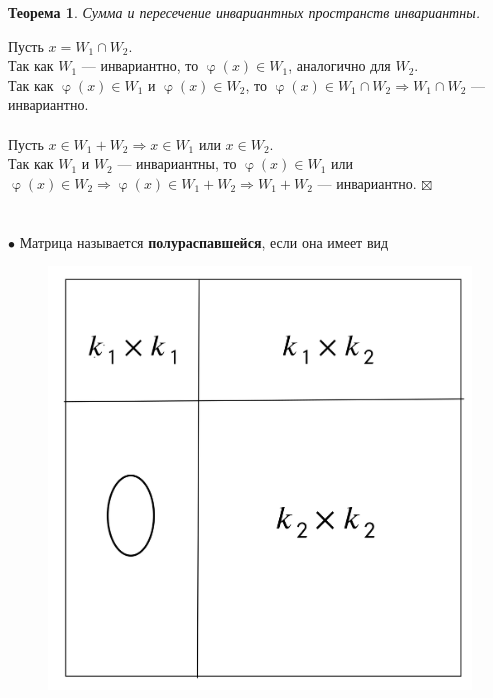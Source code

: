 \documentclass[a4paper, 12pt]{article}
\newtheorem*{theorem}{Теорема}
\newenvironment{Proof}
{\par\noindent{$\blacklozenge$}}
{\hfill$\scriptstyle\boxtimes$}
\renewcommand{\varphi}{\upvarphi}
\begin{document}
    \begin{theorem}
        Сумма и пересечение инвариантных пространств инвариантны.
    \end{theorem}
    \begin{Proof}
    Пусть $x = W_1 \cap W_2$.\\
    Так как $W_1$ --- инвариантно, то $\varphi(x) \in W_1$, аналогично для $W_2$.\\
    Так как $\varphi(x) \in W_1$ и $\varphi(x) \in W_2$, то $\varphi(x) \in W_1 \cap W_2 \Rightarrow W_1 \cap W_2$ --- инвариантно.\\\\
    Пусть $x \in W_1 + W_2 \Rightarrow x \in W_1$ или $x \in W_2$.\\
    Так как $W_1$ и $W_2$ --- инвариантны, то $\varphi(x) \in W_1$ или $\varphi(x) \in W_2 \Rightarrow \varphi(x) \in W_1 + W_2 \Rightarrow W_1 + W_2$ --- инвариантно.
    \end{Proof}\\\\\\
    $\bullet$ Матрица называется \textbf{полураспавшейся}, если она имеет вид
    \begin{figure}[h]
    \begin{center}
    \includegraphics[scale=0.15]{1.png}
    \end{center}
    \end{figure}\\
\end{document}
